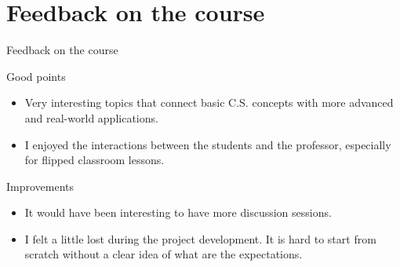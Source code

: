 \documentclass{beamer}
\begin{document}
\section{Feedback on the course}
\begin{frame}{Feedback on the course}
	\begin{block}{Good points}
		\begin{itemize}
			\item Very interesting topics that connect basic C.S. concepts with more advanced and real-world applications.
			\item I enjoyed the interactions between the students and the professor, especially for flipped classroom lessons.
		\end{itemize}
	\end{block}
	\begin{block}{Improvements}
		\begin{itemize}
			\item It would have been interesting to have more discussion sessions.
			\item I felt a little lost during the project development. It is hard to start from scratch without a clear idea of what are the expectations.
		\end{itemize}
	\end{block}
\end{frame}
\end{document}
